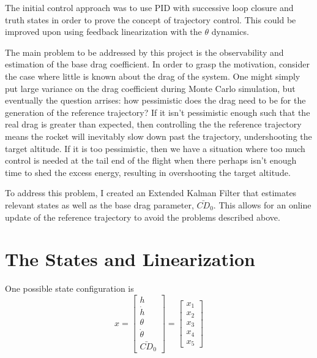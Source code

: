 \documentclass{article}
\begin{document}
  The initial control approach was to use PID with successive loop closure and truth states in order to prove the concept of trajectory control. This could be improved upon using feedback linearization with the $\theta$ dynamics.

  The main problem to be addressed by this project is the observability and estimation of the base drag coefficient. In order to grasp the motivation, consider the case where little is known about the drag of the system. One might simply put large variance on the drag coefficient during Monte Carlo simulation, but eventually the question arrises: how pessimistic does the drag need to be for the generation of the reference trajectory? If it isn't pessimistic enough such that the real drag is greater than expected, then controlling the the reference trajectory means the rocket will inevitably slow down past the trajectory, undershooting the target altitude. If it is too pessimistic, then we have a situation where too much control is needed at the tail end of the flight when there perhaps isn't enough time to shed the excess energy, resulting in overshooting the target altitude.

  To address this problem, I created an Extended Kalman Filter that estimates relevant states as well as the base drag parameter, $\bar{CD}_0$. This allows for an online update of the reference trajectory to avoid the problems described above.

\section{The States and Linearization}
  One possible state configuration is
  \begin{equation}
    x = \left[\begin{matrix} h \\
                             \dot{h} \\
                             \theta \\
                             \dot{\theta} \\
                             \bar{CD}_0         \end{matrix}\right]
      = \left[\begin{matrix} x_1 \\
                             x_2 \\
                             x_3 \\
                             x_4 \\
                             x_5         \end{matrix}\right]
  \end{equation}
\end{document}
